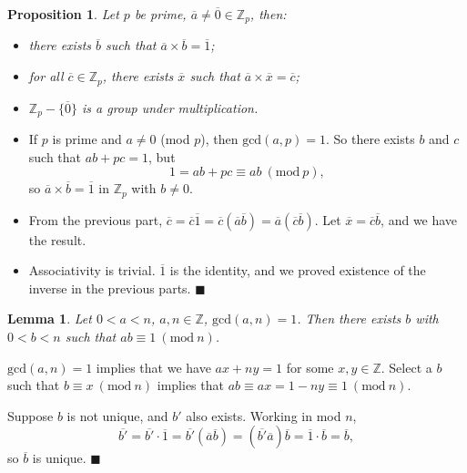 \documentclass[letter-paper]{tufte-book}
\newtheorem{lemma}[theorem]{\color{pastel-blue}Lemma}
\newtheorem{proposition}[theorem]{\color{pastel-blue}Proposition}
\newenvironment{proof}[1][Proof]{\begin{trivlist}
\item[\hskip \labelsep {\bfseries #1}]}{\end{trivlist}}
\newcommand{\qed}{\hfill$\blacksquare$}
\begin{document}
\begin{proposition}
  Let $p$ be prime, $\overline{a}\neq\overline{0}\in\mathbb{Z}_p$, then:
  \begin{itemize}
    \item there exists $\overline{b}$ such that
    $\overline{a}\times\overline{b}=\overline{1}$;
    \item for all $\overline{c}\in\mathbb{Z}_p$, there exists $\overline{x}$
    such that $\overline{a}\times\overline{x}=\overline{c}$;
    \item $\mathbb{Z}_p-\{\overline{0}\}$ is a group under multiplication.
  \end{itemize}
\end{proposition}
\begin{proof}
  \begin{itemize}
    \item If $p$ is prime and $a\neq0$ (mod $p$), then $\mbox{gcd}(a,p)=1$. So
    there exists $b$ and $c$ such that $ab+pc=1$, but
    \begin{equation*}
      1=ab+pc\equiv ab\ (\mbox{mod}\ p),
    \end{equation*}
    so $\overline{a}\times\overline{b}=\overline{1}$ in $\mathbb{Z}_p$ with
    $b\neq0$.
    \item From the previous part, $\overline{c}=\overline{c}\overline{1}=
    \overline{c}(\overline{a}\overline{b})=
    \overline{a}(\overline{c}\overline{b})$. Let
    $\overline{x}=\overline{c}\overline{b}$, and we have the result.
    \item Associativity is trivial. $\overline{1}$ is the identity, and we
    proved existence of the inverse in the previous parts. \qed
  \end{itemize}
\end{proof}

\begin{lemma}
  Let $0<a<n$, $a,n\in\mathbb{Z}$, $\mbox{gcd}(a,n)=1$. Then there exists $b$
  with $0<b<n$ such that $ab\equiv1\ (\mbox{mod}\ n)$.
\end{lemma}
\begin{proof}
  $\mbox{gcd}(a,n)=1$ implies that we have $ax+ny=1$ for some
  $x,y\in\mathbb{Z}$. Select a $b$ such that $b\equiv x\ (\mbox{mod}\ n)$
  implies that $ab\equiv ax=1-ny\equiv1\ (\mbox{mod}\ n)$.
  
  Suppose $b$ is not unique, and $b'$ also exists. Working in mod $n$,
  \begin{equation*}
    \overline{b'}=\overline{b'}\cdot\overline{1}
    =\overline{b'}(\overline{a}\overline{b})
    =(\overline{b'}\overline{a})\overline{b}=\overline{1}\cdot\overline{b}
    =\overline{b},
  \end{equation*}
  so $\overline{b}$ is unique. \qed
\end{proof}
\end{document}
